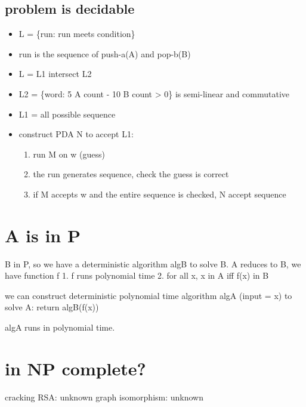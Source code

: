 \documentclass{article}
\begin{document}
\subsection{problem is decidable}
\begin{itemize}
	\item L = \{run: run meets condition\}
	\item run is the sequence of push-a(A) and pop-b(B)
	\item L = L1 intersect L2
	\item L2 = \{word: 5 A count - 10 B count > 0\} is semi-linear and commutative
	\item L1 = all possible sequence
	\item construct PDA N to accept L1:
	\begin{enumerate}
		\item run M on w (guess)
		\item the run generates sequence, check the guess is correct
		\item if M accepts w and the entire sequence is checked, N accept sequence
	\end{enumerate}
\end{itemize}

\section{A is in P}
B in P, so we have a deterministic algorithm algB to solve B.
A reduces to B, we have function f
1. f runs polynomial time
2. for all x, x in A iff f(x) in B

we can construct deterministic polynomial time algorithm algA (input = x) to solve A:
return algB(f(x))

algA runs in polynomial time.

\section{in NP complete?}
cracking RSA: unknown
graph isomorphism: unknown
\end{document}
